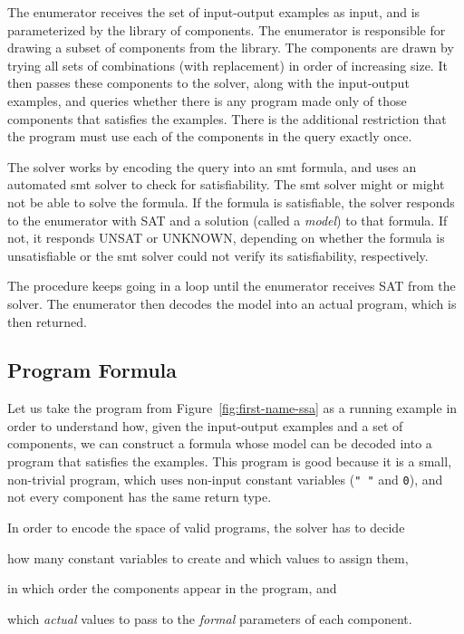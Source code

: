 The enumerator receives the set of input-output examples as input, and is
parameterized by the library of components. The enumerator is responsible for
drawing a subset of components from the library. The components are drawn by
trying all sets of combinations (with replacement) in order of increasing size.
It then passes these components to the solver, along with the input-output
examples, and queries whether there is any program made only of those components
that satisfies the examples. There is the additional restriction that the
program must use each of the components in the query exactly once.

The solver works by encoding the query into an \gls{smt} formula, and uses an
automated \gls{smt} solver to check for satisfiability. The \gls{smt} solver
might or might not be able to solve the formula. If the formula is satisfiable,
the solver responds to the enumerator with SAT and a solution (called a
\textit{model}) to that formula. If not, it responds UNSAT or UNKNOWN, depending
on whether the formula is unsatisfiable or the \gls{smt} solver could not verify
its satisfiability, respectively.

The procedure keeps going in a loop until the enumerator receives SAT from the
solver. The enumerator then decodes the model into an actual program, which is
then returned.

\subsection{Program Formula}
\label{sec:program-formula}

Let us take the program from Figure~\ref{fig:first-name-ssa} as a running
example in order to understand how, given the input-output examples and a set of
components, we can construct a formula whose model can be decoded into a program
that satisfies the examples. This program is good because it is a small,
non-trivial program, which uses non-input constant variables (\lstinline{" "}
and \lstinline{0}), and not every component has the same return type.

In order to encode the space of valid programs, the solver has to decide
\begin{enumerate*}[(1)]
\item how many constant variables to create and which values to assign them,
\item in which order the components appear in the program, and
\item which \textit{actual} values to pass to the \textit{formal} parameters of
  each component.
\end{enumerate*}

